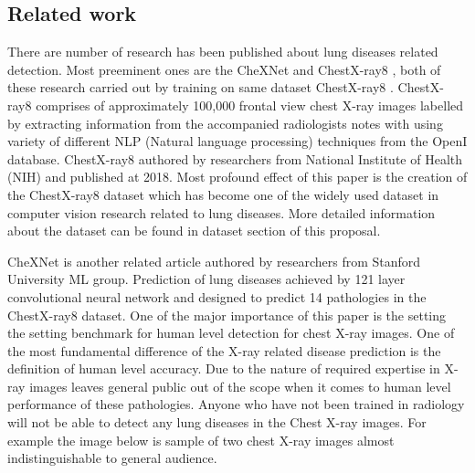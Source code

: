 \documentclass[12pt, twoside, a4paper]{article}
\begin{document}
\subsection{Related work}

There are number of research has been published about lung diseases related detection. Most preeminent ones are the CheXNet \cite{CheXNetRP} and ChestX-ray8 \cite{ChestX-ray8}, both of these research carried out by training on same dataset ChestX-ray8 \cite{ChestX-ray8}. ChestX-ray8 comprises of approximately 100,000 frontal view chest X-ray images labelled by extracting information from the accompanied radiologists notes with using variety of different NLP (Natural language processing) techniques from the OpenI\cite{openi} database. ChestX-ray8 authored by researchers from National Institute of Health (NIH) and published at 2018.
Most profound effect of this paper is the creation of the ChestX-ray8 dataset which has become one of the widely used dataset in computer vision research related to lung diseases. More detailed information about the dataset can be found in dataset section of this proposal. 

CheXNet is another related article authored by researchers from Stanford University ML group. Prediction of lung diseases achieved by 121 layer convolutional neural network and designed to predict 14 pathologies in the ChestX-ray8 dataset. One of the major importance of this paper is the setting the setting benchmark for human level detection for chest X-ray images. One of the most fundamental difference of the X-ray related disease prediction is the definition of human level accuracy. Due to the nature of required expertise in X-ray images leaves general public out of the scope when it comes to human level performance of these pathologies. Anyone who have not been trained in radiology will not be able to detect any lung diseases in the Chest X-ray images. For example the image below is sample of two chest X-ray images almost indistinguishable to general audience.
\end{document}
